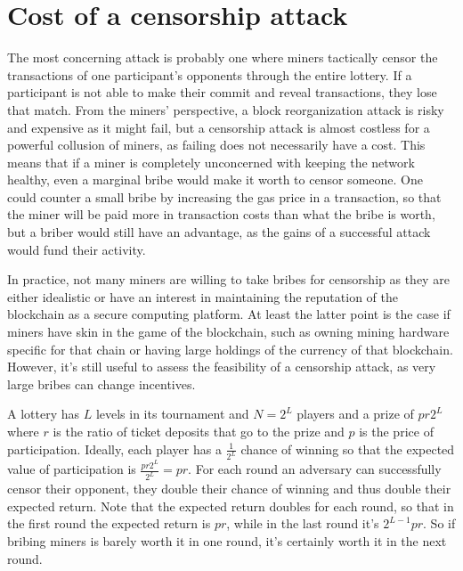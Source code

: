 \section{Cost of a censorship attack}
\label{sec:censorship}
The most concerning attack is probably one where miners tactically censor the transactions of one participant's opponents through the entire lottery. If a participant is not able to make their commit and reveal transactions, they lose that match. From the miners' perspective, a block reorganization attack is risky and expensive as it might fail, but a censorship attack is almost costless for a powerful collusion of miners, as failing does not necessarily have a cost. This means that if a miner is completely unconcerned with keeping the network healthy, even a marginal bribe would make it worth to censor someone. One could counter a small bribe by increasing the gas price in a transaction, so that the miner will be paid more in transaction costs than what the bribe is worth, but a briber would still have an advantage, as the gains of a successful attack would fund their activity. 

In practice, not many miners are willing to take bribes for censorship as they are either idealistic or have an interest in maintaining the reputation of the blockchain as a secure computing platform. At least the latter point is the case if miners have skin in the game of the blockchain, such as owning mining hardware specific for that chain or having large holdings of the currency of that blockchain. However, it's still useful to assess the feasibility of a censorship attack, as very large bribes can change incentives.

A lottery has $L$ levels in its tournament and $N=2^L$ players and a prize of $pr2^L$ where $r$ is the ratio of ticket deposits that go to the prize and $p$ is the price of participation. Ideally, each player has a $\frac{1}{2^L}$ chance of winning so that the expected value of participation is $\frac{pr2^L}{2^L}=pr$. For each round an adversary can successfully censor their opponent, they double their chance of winning and thus double their expected return. Note that the expected return doubles for each round, so that in the first round the expected return is $pr$, while in the last round it's $2^{L-1}pr$. So if bribing miners is barely worth it in one round, it's certainly worth it in the next round.

